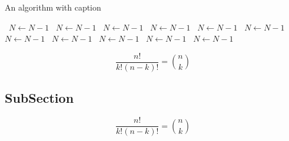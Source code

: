 \documentclass[a4paper]{article}
\begin{document}
\begin{algorithm}
\caption{An algorithm with caption}
\begin{algorithmic}
\    \State $N \gets N - 1$
\    \State $N \gets N - 1$
\    \State $N \gets N - 1$
\    \State $N \gets N - 1$
\    \State $N \gets N - 1$
\    \State $N \gets N - 1$
\    \State $N \gets N - 1$
\    \State $N \gets N - 1$
\    \State $N \gets N - 1$
\    \State $N \gets N - 1$
\    \State $N \gets N - 1$
\EndWhile
\end{algorithmic}
\end{algorithm}

\[ \frac{n!}{k!(n-k)!} = \binom{n}{k} \]

\subsection{SubSection}

\[ \frac{n!}{k!(n-k)!} = \binom{n}{k} \]
\end{document}
